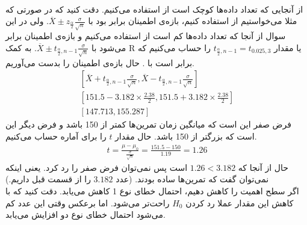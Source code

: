 \\ %
از آنجایی که تعداد داده‌ها کوچک است از
استفاده می‌کنیم. دقت کنید که در صورتی که مثلا می‌خواستیم از
استفاده کنیم، بازه‌ی اطمینان برابر بود با
$\overline{X} \pm z_{\frac{\alpha}{2}} \frac{\sigma}{\sqrt{n}}$.
ولی در این سوال از آنجا که تعداد داده‌ها کم است از
استفاده می‌کنیم و بازه‌ی اطمینان برابر می‌شود با
$\overline{X} \pm t_{\frac{\alpha}{2}, n - 1} \frac{\sigma}{\sqrt{n}}$.
به کمک
R
یا
مقدار
$t_{\frac{\alpha}{2}, n - 1} = t_{0.025, 3}$
را حساب می‌کنیم که برابر است با
. %
حال بازه‌ی اطمینان را بدست می‌آوریم.
\begin{gather*}
    \left[ \overline{X} + t_{\frac{\alpha}{2}, n - 1} \frac{\sigma}{\sqrt{n}} , \overline{X} - t_{\frac{\alpha}{2}, n - 1} \frac{\sigma}{\sqrt{n}} \right]\\
    \left[ 151.5 - 3.182 \times \frac{2.38}{2} , 151.5 + 3.182 \times \frac{2.38}{2} \right]\\
    \left[147.713, 155.287 \right]
\end{gather*}
فرض صفر این است که میانگین زمان تمرین‌ها کمتر از 150 باشد و فرض دیگر این است که بزرگتر از 150 باشد.
حال مقدار
$t$
را برای آماره حساب می‌کنیم.
\begin{gather*}
    t = \frac{\mu - \mu_0}{\frac{\sigma}{\sqrt{n}}} = \frac{151.5 - 150}{1.19} = 1.26
\end{gather*}
حال از آنجا که
$1.26 < 3.182$
است پس نمی‌توان فرض صفر را رد کرد. یعنی اینکه نمی‌توان گفت که تمرین‌ها ساده بودند.
(عدد
$3.182$
را از قسمت قبل داریم.)
\\
اگر سطح اهمیت را کاهش دهیم، احتمال خطای نوع 1 کاهش می‌یابد. دقت کنید که با کاهش این مقدار عملا رد کردن
$H_0$
راحت‌تر می‌شود.
اما برعکس وقتی این عدد کم می‌شود احتمال خطای نوع دو افزایش می‌یابد.
